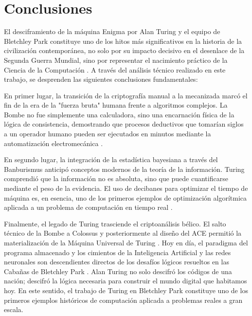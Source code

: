 \section{Conclusiones}

El desciframiento de la máquina Enigma por Alan Turing y el equipo de Bletchley Park constituye uno de los hitos más significativos en la historia de la civilización contemporánea, no solo por su impacto decisivo en el desenlace de la Segunda Guerra Mundial, sino por representar el nacimiento práctico de la Ciencia de la Computación \cite{hodges2014turing, lahoz2012turing}. A través del análisis técnico realizado en este trabajo, se desprenden las siguientes conclusiones fundamentales:

En primer lugar, la transición de la criptografía manual a la mecanizada marcó el fin de la era de la "fuerza bruta" humana frente a algoritmos complejos. La Bombe no fue simplemente una calculadora, sino una encarnación física de la lógica de consistencia, demostrando que procesos deductivos que tomarían siglos a un operador humano pueden ser ejecutados en minutos mediante la automatización electromecánica \cite{copeland2004essential, lahoz2012turing}.

En segundo lugar, la integración de la estadística bayesiana a través del Banburismus anticipó conceptos modernos de la teoría de la información. Turing comprendió que la información no es absoluta, sino que puede cuantificarse mediante el peso de la evidencia. El uso de decibanes para optimizar el tiempo de máquina es, en esencia, uno de los primeros ejemplos de optimización algorítmica aplicada a un problema de computación en tiempo real \cite{hodges2014turing, copeland2004essential}.

Finalmente, el legado de Turing trasciende el criptoanálisis bélico. El salto técnico de la Bombe a Colossus y posteriormente al diseño del ACE permitió la materialización de la Máquina Universal de Turing \cite{copeland2006colossus}. Hoy en día, el paradigma del programa almacenado y los cimientos de la Inteligencia Artificial y las redes neuronales son descendientes directos de los desafíos lógicos resueltos en las Cabañas de Bletchley Park \cite{lahoz2012turing, strathern1997turing}. Alan Turing no solo descifró los códigos de una nación; descifró la lógica necesaria para construir el mundo digital que habitamos hoy. En este sentido, el trabajo de Turing en Bletchley Park constituye uno de los primeros ejemplos históricos de computación aplicada a problemas reales a gran escala.

